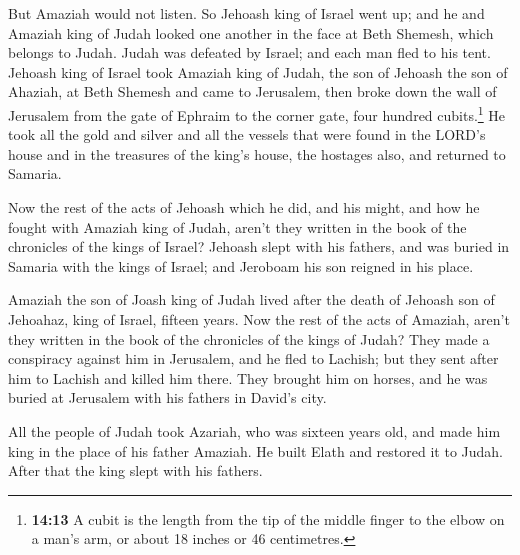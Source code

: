  But Amaziah would not listen. So Jehoash king of Israel
went up; and he and Amaziah king of Judah looked one another in the face
at Beth Shemesh, which belongs to Judah.  Judah was
defeated by Israel; and each man fled to his tent. 
Jehoash king of Israel took Amaziah king of Judah, the son of Jehoash
the son of Ahaziah, at Beth Shemesh and came to Jerusalem, then broke
down the wall of Jerusalem from the gate of Ephraim to the corner gate,
four hundred cubits.\footnote{\textbf{14:13} A cubit is the length from
  the tip of the middle finger to the elbow on a man's arm, or about 18
  inches or 46 centimetres.}  He took all the gold and
silver and all the vessels that were found in the LORD's house and in
the treasures of the king's house, the hostages also, and returned to
Samaria.

 Now the rest of the acts of Jehoash which he did, and
his might, and how he fought with Amaziah king of Judah, aren't they
written in the book of the chronicles of the kings of Israel?
 Jehoash slept with his fathers, and was buried in
Samaria with the kings of Israel; and Jeroboam his son reigned in his
place.

 Amaziah the son of Joash king of Judah lived after the
death of Jehoash son of Jehoahaz, king of Israel, fifteen years.
 Now the rest of the acts of Amaziah, aren't they written
in the book of the chronicles of the kings of Judah? 
They made a conspiracy against him in Jerusalem, and he fled to Lachish;
but they sent after him to Lachish and killed him there. 
They brought him on horses, and he was buried at Jerusalem with his
fathers in David's city.

 All the people of Judah took Azariah, who was sixteen
years old, and made him king in the place of his father Amaziah.
 He built Elath and restored it to Judah. After that the
king slept with his fathers.

